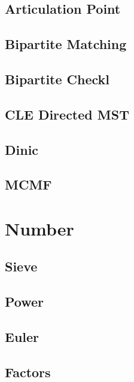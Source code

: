 \subsection{Articulation Point}


\subsection{Bipartite Matching}


\subsection{Bipartite Checkl}


\subsection{CLE Directed MST}


\subsection{Dinic}


\subsection{MCMF}

\section{Number}

\subsection{Sieve}


\subsection{Power}


\subsection{Euler}


\subsection{Factors}


